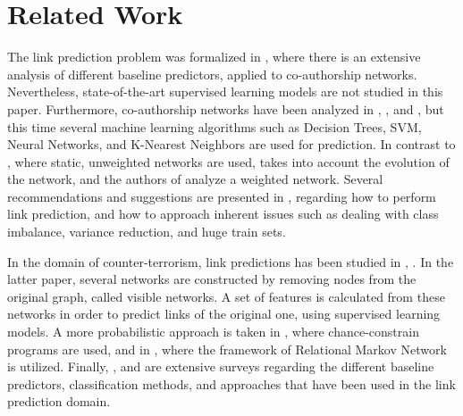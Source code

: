 \documentclass{acm_proc_article-sp}
\begin{document}
\section{Related Work}
\label{Sect.3}

The link prediction problem was formalized in \cite{Liben-Nowell:2003:LPP:956863.956972}, where there is an extensive analysis of different baseline predictors, applied to co-authorship networks. Nevertheless, state-of-the-art supervised learning models are not studied in this paper. Furthermore, co-authorship networks have been analyzed in \cite{Hasan06linkprediction}, \cite{Pavlov:2007:FEL:2889513.2889517}, and \cite{de2011supervised}, but this time several machine learning algorithms such as Decision Trees, SVM, Neural Networks, and K-Nearest Neighbors are used for prediction. In contrast to \cite{Hasan06linkprediction}, where static, unweighted networks are used, \cite{Pavlov:2007:FEL:2889513.2889517} takes into account the evolution of the network, and the authors of \cite{de2011supervised} analyze a weighted network. Several recommendations and suggestions are presented in \cite{Lichtenwalter:2010:NPM:1835804.1835837}, regarding how to perform link prediction, and how to approach inherent issues such as dealing with class imbalance, variance reduction, and huge train sets. 

In the domain of counter-terrorism, link predictions has been studied in \cite{dombroski2003estimating}, \cite{Fire2013}. In the latter paper, several networks are constructed by removing nodes from the original graph, called visible networks. A set of features is calculated from these networks in order to predict links of the original one, using supervised learning models. A more probabilistic approach is taken in \cite{doppa:nips09-wkshp}, where chance-constrain programs are used, and in \cite{NIPS2003_2465}, where the framework of Relational Markov Network is utilized. Finally, \cite{DBLP:journals/corr/WangXWZ14}, and \cite{Hasan2011} are extensive surveys regarding the different baseline predictors, classification methods, and approaches that have been used in the link prediction domain. 

\end{document}
